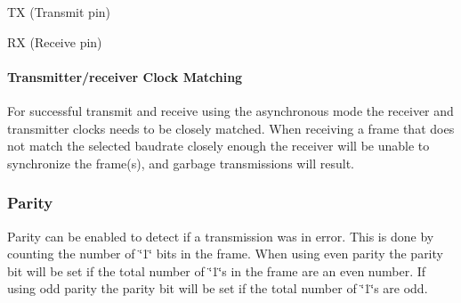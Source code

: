 \begin{DoxyItemize}
\item TX (Transmit pin)
\item RX (Receive pin)
\end{DoxyItemize}\hypertarget{group__asfdoc__sam0__sercom__usart__group_asfdoc_sam0_sercom_usart_overview_async_clock_matching}{}\paragraph{Transmitter/receiver Clock Matching}\label{group__asfdoc__sam0__sercom__usart__group_asfdoc_sam0_sercom_usart_overview_async_clock_matching}
For successful transmit and receive using the asynchronous mode the receiver and transmitter clocks needs to be closely matched. When receiving a frame that does not match the selected baudrate closely enough the receiver will be unable to synchronize the frame(s), and garbage transmissions will result.\hypertarget{group__asfdoc__sam0__sercom__usart__group_asfdoc_sam0_sercom_usart_parity}{}\subsubsection{Parity}\label{group__asfdoc__sam0__sercom__usart__group_asfdoc_sam0_sercom_usart_parity}
Parity can be enabled to detect if a transmission was in error. This is done by counting the number of \char`\"{}1\char`\"{} bits in the frame. When using even parity the parity bit will be set if the total number of \char`\"{}1\char`\"{}s in the frame are an even number. If using odd parity the parity bit will be set if the total number of \char`\"{}1\char`\"{}s are odd.

